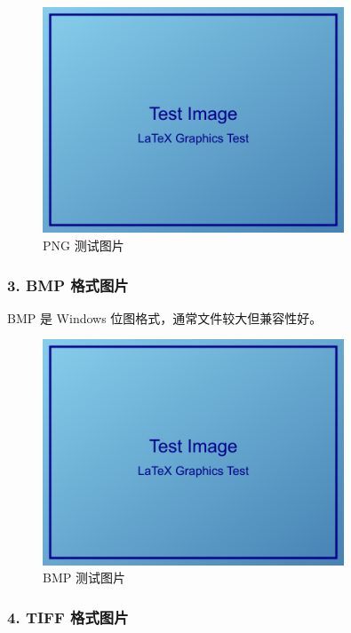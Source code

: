 \documentclass[UTF8, a4paper, 12pt]{ctexart}
\begin{document}
\begin{figure}[H]
    \centering
    \includegraphics[width=0.8\textwidth]{../../tests/images/test_image.png}
    \caption{PNG 测试图片}
    \label{fig:png_____}
\end{figure}



\subsubsection{3. BMP 格式图片}


BMP 是 Windows 位图格式，通常文件较大但兼容性好。


\begin{figure}[H]
    \centering
    \includegraphics[width=0.8\textwidth]{../../tests/images/test_image.bmp}
    \caption{BMP 测试图片}
    \label{fig:bmp_____}
\end{figure}



\subsubsection{4. TIFF 格式图片}
\end{document}
